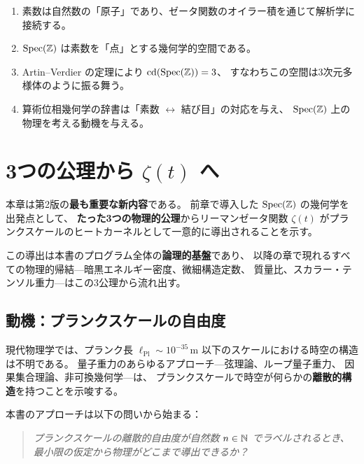 \begin{remark}[本章のまとめ]
\begin{enumerate}
  \item 素数は自然数の「原子」であり、ゼータ関数のオイラー積を通じて解析学に接続する。
  \item $\operatorname{Spec}(\mathbb{Z})$ は素数を「点」とする幾何学的空間である。
  \item Artin--Verdier の定理により $\operatorname{cd}(\operatorname{Spec}(\mathbb{Z})) = 3$、
        すなわちこの空間は3次元多様体のように振る舞う。
  \item 算術位相幾何学の辞書は「素数 $\leftrightarrow$ 結び目」の対応を与え、
        $\operatorname{Spec}(\mathbb{Z})$ 上の物理を考える動機を与える。
\end{enumerate}
\end{remark}



\chapter{3つの公理から $\zeta(t)$ へ}
\label{ch:three-axioms}

本章は第2版の\textbf{最も重要な新内容}である。
前章で導入した $\operatorname{Spec}(\mathbb{Z})$ の幾何学を出発点として、
\textbf{たった3つの物理的公理}からリーマンゼータ関数 $\zeta(t)$
がプランクスケールのヒートカーネルとして一意的に導出されることを示す。

この導出は本書のプログラム全体の\textbf{論理的基盤}であり、
以降の章で現れるすべての物理的帰結---暗黒エネルギー密度、微細構造定数、
質量比、スカラー・テンソル重力---はこの3公理から流れ出す。


\section{動機：プランクスケールの自由度}
\label{sec:axioms-motivation}

現代物理学では、プランク長 $\ell_{\mathrm{Pl}} \sim 10^{-35}\,\mathrm{m}$
以下のスケールにおける時空の構造は不明である。
量子重力のあらゆるアプローチ---弦理論、ループ量子重力、
因果集合理論、非可換幾何学---は、
プランクスケールで時空が何らかの\textbf{離散的構造}を持つことを示唆する。

本書のアプローチは以下の問いから始まる：

\begin{quote}
\emph{プランクスケールの離散的自由度が自然数 $n \in \mathbb{N}$ でラベルされるとき、\\
最小限の仮定から物理がどこまで導出できるか？}
\end{quote}

